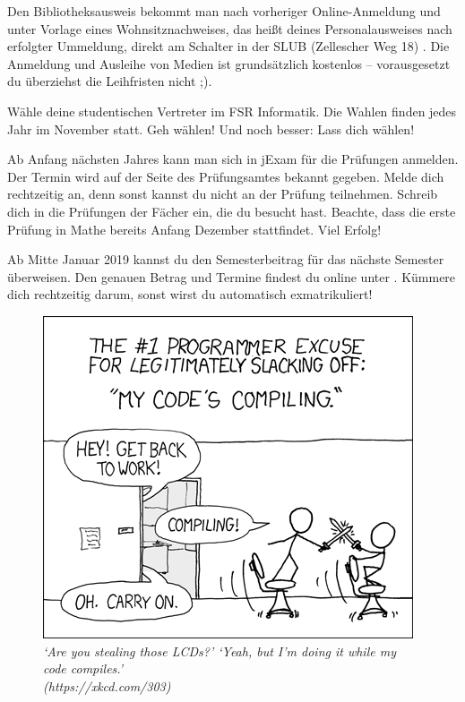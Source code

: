 \begin{itemize}[leftmargin=*]
Den Bibliotheksausweis bekommt man nach vorheriger Online-Anmeldung und unter Vorlage eines
Wohnsitznachweises, das heißt deines Personalausweises nach erfolgter Ummeldung,
direkt am Schalter in der SLUB (Zellescher Weg 18)
. Die Anmeldung und Ausleihe
von Medien ist grundsätzlich kostenlos -- vorausgesetzt du überziehst die
Leihfristen nicht ;).

Wähle deine studentischen Vertreter im FSR Informatik. Die Wahlen finden jedes
Jahr im November statt. Geh wählen! Und noch besser: Lass dich wählen!

\pagebreak

Ab Anfang nächsten Jahres kann man sich in jExam  für die Prüfungen anmelden.
Der Termin wird auf der Seite des Prüfungsamtes bekannt gegeben. Melde dich
rechtzeitig an, denn sonst kannst du nicht an der Prüfung teilnehmen. Schreib
dich in die Prüfungen der Fächer ein, die du besucht hast. Beachte, dass die
erste Prüfung in Mathe bereits Anfang Dezember stattfindet. Viel Erfolg!

Ab Mitte Januar 2019 kannst du den Semesterbeitrag für das nächste Semester
überweisen. Den genauen Betrag und Termine findest du online unter
. Kümmere dich rechtzeitig darum,
sonst wirst du automatisch exmatrikuliert!

\end{itemize}

\vfill

\begin{figure}[h!]
\centering
\includegraphics[scale=.7]{img/xkcd/compiling.png}
\caption*{{\small
    \foreignlanguage{english}{
      \textit{\enquote*{Are you stealing those LCDs?} \enquote*{Yeah, but I'm doing it while my code compiles.}\\\hspace*{1mm}\hfill(https://xkcd.com/303)}
    }
  }
}
\end{figure}
